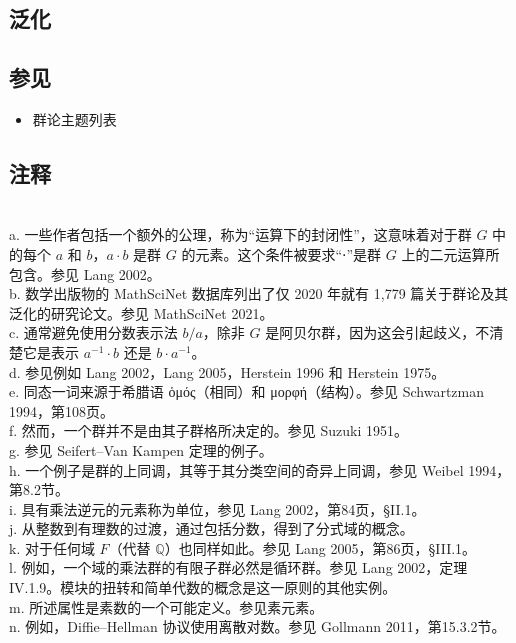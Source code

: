 \subsection{泛化}




\subsection{参见}
\begin{itemize}
\item 群论主题列表
\end{itemize}
\subsection{注释}\\  
a. 一些作者包括一个额外的公理，称为“运算下的封闭性”，这意味着对于群 \(G\) 中的每个 \(a\) 和 \(b\)，\(a \cdot b\) 是群 \(G\) 的元素。这个条件被要求“⋅”是群 \(G\) 上的二元运算所包含。参见 Lang 2002。\\   
b. 数学出版物的 MathSciNet 数据库列出了仅 2020 年就有 1,779 篇关于群论及其泛化的研究论文。参见 MathSciNet 2021。\\   
c. 通常避免使用分数表示法 \(b/a\)，除非 \(G\) 是阿贝尔群，因为这会引起歧义，不清楚它是表示 \(a^{-1} \cdot b\) 还是 \(b \cdot a^{-1}\)。\\   
d. 参见例如 Lang 2002，Lang 2005，Herstein 1996 和 Herstein 1975。\\   
e. 同态一词来源于希腊语 ὁμός（相同）和 μορφή（结构）。参见 Schwartzman 1994，第108页。\\   
f. 然而，一个群并不是由其子群格所决定的。参见 Suzuki 1951。\\   
g. 参见 Seifert–Van Kampen 定理的例子。\\   
h. 一个例子是群的上同调，其等于其分类空间的奇异上同调，参见 Weibel 1994，第8.2节。\\   
i. 具有乘法逆元的元素称为单位，参见 Lang 2002，第84页，§II.1。\\   
j. 从整数到有理数的过渡，通过包括分数，得到了分式域的概念。\\   
k. 对于任何域 \(F\)（代替 \(\mathbb{Q}\)）也同样如此。参见 Lang 2005，第86页，§III.1。\\   
l. 例如，一个域的乘法群的有限子群必然是循环群。参见 Lang 2002，定理 IV.1.9。模块的扭转和简单代数的概念是这一原则的其他实例。\\   
m. 所述属性是素数的一个可能定义。参见素元素。\\   
n. 例如，Diffie–Hellman 协议使用离散对数。参见 Gollmann 2011，第15.3.2节。\\   
